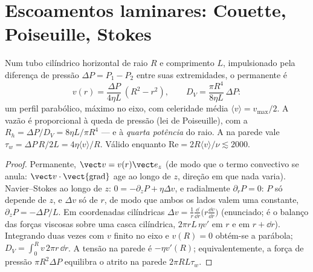 \section{Escoamentos laminares: Couette, Poiseuille, Stokes}

\begin{proposition}\label{prop:b2:viscous-flows:poiseuille}
Num tubo cilíndrico horizontal de raio $R$ e comprimento $L$, impulsionado pela
diferença de pressão $\Delta P = P_1 - P_2$ entre suas extremidades, o  permanente é
\[
v(r) = \frac{\Delta P}{4\eta L}\,(R^2 - r^2) , \qquad
D_V = \frac{\pi R^4}{8\eta L}\,\Delta P :
\]
um perfil parabólico, máximo no eixo, com celeridade média
$\langle v\rangle = v_{\max}/2$. A vazão é proporcional à
queda de pressão (lei de Poiseuille), com a \emph{}
$R_h = \Delta P/D_V = 8\eta L/\pi R^4$ --- e à \emph{quarta potência} do
raio. A  na parede vale $\tau_w = \Delta P\,R/2L = 4\eta\langle v
\rangle/R$. Válido enquanto $\mathrm{Re} = 2R\langle v\rangle/\nu \lesssim 2000$.
\end{proposition}

\begin{proof}
Permanente, $\vect v = v(r)\vect e_z$ (de modo que o termo convectivo se anula: $\vect v
\cdot\operatorname{\vect{grad}}$ age ao longo de $z$, direção em que nada
varia). Navier--Stokes ao longo de $z$: $0 = -\partial_zP + \eta\Delta v$, e
radialmente $\partial_rP = 0$: $P$ só depende de $z$, e $\Delta v$ só de $r$, de modo que
ambos os lados valem uma constante, $\partial_zP = -\Delta P/L$. Em coordenadas
cilíndricas $\Delta v = \frac1r\frac{\dd}{\dd r}\bigl(r\frac{\dd v}{\dd r}\bigr)$
(enunciado; é o balanço das forças viscosas sobre uma casca cilíndrica,
$2\pi rL\,\eta v'$ em $r$ e em $r + \dd r$). Integrando duas vezes com $v$
finito no eixo e $v(R) = 0$ obtém-se a parábola; $D_V = \int_0^Rv\,2\pi
r\,\dd r$. A tensão na parede é $-\eta v'(R)$; equivalentemente, a força
de pressão $\pi R^2\Delta P$ equilibra o atrito na parede $2\pi RL\tau_w$.
\end{proof}

